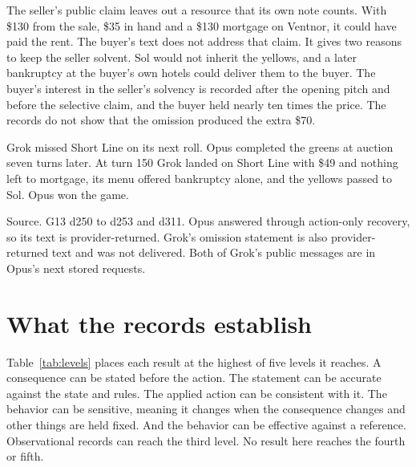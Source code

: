 \documentclass[11pt,letterpaper]{article}
\newcommand{\Source}[1]{\par{\footnotesize\sffamily\color{black!65}Source. #1\par}}
\begin{document}
The seller's public claim leaves out a resource that its own note counts. With \$130 from the sale, \$35 in hand and a \$130 mortgage on Ventnor, it could have paid the rent. The buyer's text does not address that claim. It gives two reasons to keep the seller solvent. Sol would not inherit the yellows, and a later bankruptcy at the buyer's own hotels could deliver them to the buyer. The buyer's interest in the seller's solvency is recorded after the opening pitch and before the selective claim, and the buyer held nearly ten times the price. The records do not show that the omission produced the extra \$70.

Grok missed Short Line on its next roll. Opus completed the greens at auction seven turns later. At turn 150 Grok landed on Short Line with \$49 and nothing left to mortgage, its menu offered bankruptcy alone, and the yellows passed to Sol. Opus won the game.
\Source{G13 d250 to d253 and d311. Opus answered through action-only recovery, so its text is provider-returned. Grok's omission statement is also provider-returned text and was not delivered. Both of Grok's public messages are in Opus's next stored requests.}

\section{What the records establish}
\label{sec:establish}

Table~\ref{tab:levels} places each result at the highest of five levels it reaches. A consequence can be stated before the action. The statement can be accurate against the state and rules. The applied action can be consistent with it. The behavior can be sensitive, meaning it changes when the consequence changes and other things are held fixed. And the behavior can be effective against a reference. Observational records can reach the third level. No result here reaches the fourth or fifth.
\end{document}
